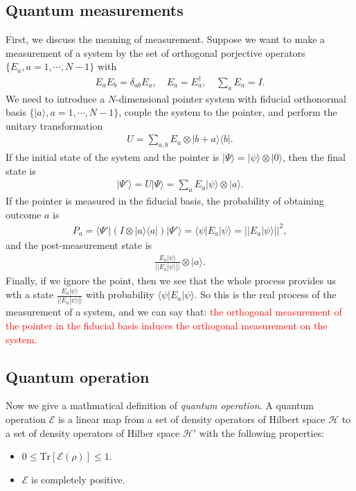 \documentclass{article}
\newcommand{\ket}[1]{| #1 \rangle}  %
\newcommand{\bra}[1]{\langle #1|} %
\begin{document}
\subsection{Quantum measurements}

First, we discuss the meaning of measurement. Suppose we want to make a measurement of a system by the set of orthogonal porjective operators $\{E_a, a=1,\cdots,N-1\}$ with
\begin{align}
	E_a E_b = \delta_{ab}E_a, \quad E_a = E_a^{\dagger}, \quad \sum_a E_a =I.
\end{align}
We need to introduce a $N$-dimensional pointer system with fiducial orthonormal basis $\{\ket{a}, a=1,\cdots,N-1\}$, couple the system to the pointer,  and perform the unitary transformation 
\begin{align}
	U=\sum_{a,b} E_a \otimes \ket{b+a}\bra{b}.
\end{align}
If the initial state of the system and the pointer is $\ket{\Psi} = \ket{\psi} \otimes \ket{0}$, then the final state is
\begin{align}
	\ket{\Psi'}=U\ket{\Psi} = \sum_a E_a \ket{\psi}\otimes \ket{a}.
\end{align}
If the pointer is measured in the fiducial basis, the probability of obtaining outcome $a$ is
\begin{align}
	P_a = \bra{\Psi'}( I\otimes \ket{a}\bra{a} )\ket{\Psi'} = \bra{\psi} E_a \ket{\psi} = ||E_a \ket{\psi}||^2,
\end{align}
and the post-measurement state is
\begin{align}
	\frac{E_a \ket{\psi}}{||E_a \ket{\psi}||} \otimes \ket{a}.
\end{align}
Finally, if we ignore the point, then we see that the whole process provides us wth a state $\frac{E_a \ket{\psi}}{||E_a \ket{\psi}||} $ with probability $ \bra{\psi} E_a \ket{\psi} $.
So this is the real process of the measurement of a system, and we can say that: \textcolor{red}{the orthogonal measurement of the pointer in the fiducial basis induces the orthogonal measurement on the system.}





\subsection{Quantum operation}

Now we give a mathmatical definition of \textit{quantum operation}. A quantum operation $\mathcal{E}$ is a linear map from a set of density operators of Hilbert space $\mathcal{H}$ to a set of density operators of Hilber space $\mathcal{H}'$ with the following properties:
\begin{itemize}
	\item $0\le \text{Tr}[\mathcal{E}(\rho)] \le 1$.
	\item $\mathcal{E}$ is completely positive. 
\end{itemize}
\end{document}
